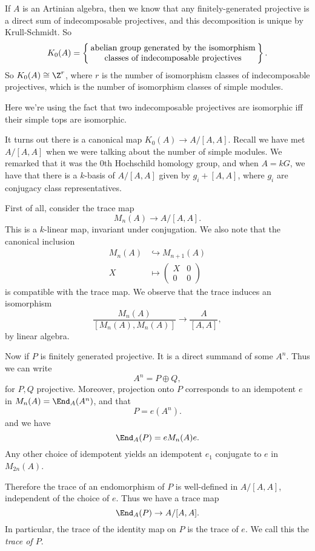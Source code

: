 \documentclass[a4paper]{article}
\begin{document}
\begin{eg}
  If $A$ is an Artinian algebra, then we know that any finitely-generated projective is a direct sum of indecomposable projectives, and this decomposition is unique by Krull-Schmidt. So
  \[
    K_0(A) = \left\{\parbox{7cm}{\centering abelian group generated by the isomorphism classes of indecomposable projectives}\right\}.
  \]
  So $K_0(A) \cong \Z^r$, where $r$ is the number of isomorphism classes of indecomposable projectives, which is the number of isomorphism classes of simple modules.

  Here we're using the fact that two indecomposable projectives are isomorphic iff their simple tops are isomorphic.
\end{eg}

It turns out there is a canonical map $K_0(A) \to A/[A, A]$. Recall we have met $A/[A, A]$ when we were talking about the number of simple modules. We remarked that it was the $0$th Hochschild homology group, and when $A = kG$, we have that there is a $k$-basis of $A/[A, A]$ given by $g_i + [A, A]$, where $g_i$ are conjugacy class representatives.

First of all, consider the trace map
\[
  M_n(A) \to A/[A, A].
\]
This is a $k$-linear map, invariant under conjugation. We also note that the canonical inclusion
\begin{align*}
  M_n(A) &\hookrightarrow M_{n + 1}(A)\\
  X & \mapsto
  \begin{pmatrix}
    X & 0\\
    0 & 0
  \end{pmatrix}
\end{align*}
is compatible with the trace map. We observe that the trace induces an isomorphism
\[
  \frac{M_n(A)}{[M_n(A), M_n(A)]} \to \frac{A}{[A, A]},
\]
by linear algebra.

Now if $P$ is finitely generated projective. It is a direct summand of some $A^n$. Thus we can write
\[
  A^n = P \oplus Q,
\]
for $P, Q$ projective. Moreover, projection onto $P$ corresponds to an idempotent $e$ in $M_n(A) = \End_A(A^n)$, and that
\[
  P = e(A^n).
\]
and we have
\[
  \End_A(P) = e M_n(A) e.
\]
Any other choice of idempotent yields an idempotent $e_1$ conjugate to $e$ in $M_{2n}(A)$. %

Therefore the trace of an endomorphism of $P$ is well-defined in $A/[A, A]$, independent of the choice of $e$. Thus we have a trace map
\[
  \End_A(P) \to A/[A, A].
\]
In particular, the trace of the identity map on $P$ is the trace of $e$. We call this the \emph{trace of $P$}.
\end{document}
